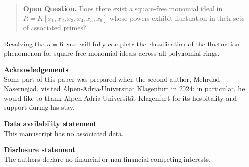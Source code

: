 \documentclass[11pt]{amsart}
\begin{document}
\begin{quote}
\textbf{Open Question.} Does there exist a square-free monomial ideal in $R = K[x_1, x_2, x_3, x_4, x_5, x_6]$ whose powers exhibit fluctuation in their sets of associated primes?
\end{quote}

Resolving the $n = 6$ case will fully complete the classification of the fluctuation phenomenon for square-free monomial ideals across all polynomial rings.






\vspace{1.2cm}
\noindent\textbf{Acknowledgements}\\
Some  part of this paper was prepared when the second author, Mehrdad Nasernejad,   visited Alpen-Adria-Universit\"at Klagenfurt  in 2024; in particular, he  would like to thank 
Alpen-Adria-Universit\"at Klagenfurt for its hospitality and support during his stay.
 


 \bigskip
\noindent\textbf{Data availability statement}\\
This manuscript has no associated data.  


\bigskip
\noindent\textbf{Disclosure statement}\\
The authors declare no financial or non-financial competing interests.  
\end{document}
